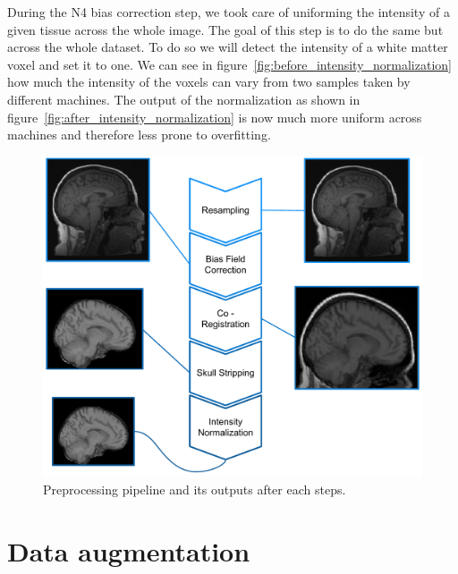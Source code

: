 During the N4 bias correction step, we took care of uniforming the intensity of a given tissue across the whole image. The goal of this step is to do the same but across the whole dataset. To do so we will detect the intensity of a white matter voxel and set it to one. We can see in figure~\ref{fig:before_intensity_normalization} how much the intensity of the voxels can vary from two samples taken by different machines. The output of the normalization as shown in figure~\ref{fig:after_intensity_normalization} is now much more uniform across machines and therefore less prone to overfitting.

\begin{figure}
    \centering
    \includegraphics[width=1.0\textwidth]{figures/preprocessing/pipeline.pdf}
    \caption{Preprocessing pipeline and its outputs after each steps.}
    \label{fig:pipeline}
\end{figure}


\section{Data augmentation}

